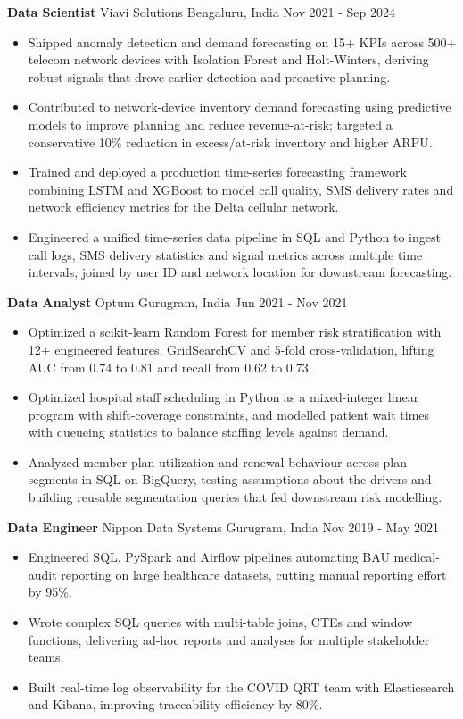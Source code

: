 \documentclass[10pt,a4paper]{article}
\newcommand{\role}[4]{\textbf{#1} \textbar{} #2 \hfill #3 \textbar{} #4\par}
\begin{document}
\vspace{3pt}
\role{Data Scientist}{Viavi Solutions}{Bengaluru, India}{Nov 2021 - Sep 2024}
\begin{itemize}
  \item Shipped anomaly detection and demand forecasting on 15+ KPIs across 500+ telecom network devices with Isolation Forest and Holt-Winters, deriving robust signals that drove earlier detection and proactive planning.
  \item Contributed to network-device inventory demand forecasting using predictive models to improve planning and reduce revenue-at-risk; targeted a conservative 10\% reduction in excess/at-risk inventory and higher ARPU.
  \item Trained and deployed a production time-series forecasting framework combining LSTM and XGBoost to model call quality, SMS delivery rates and network efficiency metrics for the Delta cellular network.
  \item Engineered a unified time-series data pipeline in SQL and Python to ingest call logs, SMS delivery statistics and signal metrics across multiple time intervals, joined by user ID and network location for downstream forecasting.
\end{itemize}
\vspace{3pt}
\role{Data Analyst}{Optum}{Gurugram, India}{Jun 2021 - Nov 2021}
\begin{itemize}
  \item Optimized a scikit-learn Random Forest for member risk stratification with 12+ engineered features, GridSearchCV and 5-fold cross-validation, lifting AUC from 0.74 to 0.81 and recall from 0.62 to 0.73.
  \item Optimized hospital staff scheduling in Python as a mixed-integer linear program with shift-coverage constraints, and modelled patient wait times with queueing statistics to balance staffing levels against demand.
  \item Analyzed member plan utilization and renewal behaviour across plan segments in SQL on BigQuery, testing assumptions about the drivers and building reusable segmentation queries that fed downstream risk modelling.
\end{itemize}
\vspace{3pt}
\role{Data Engineer}{Nippon Data Systems}{Gurugram, India}{Nov 2019 - May 2021}
\begin{itemize}
  \item Engineered SQL, PySpark and Airflow pipelines automating BAU medical-audit reporting on large healthcare datasets, cutting manual reporting effort by 95\%.
  \item Wrote complex SQL queries with multi-table joins, CTEs and window functions, delivering ad-hoc reports and analyses for multiple stakeholder teams.
  \item Built real-time log observability for the COVID QRT team with Elasticsearch and Kibana, improving traceability efficiency by 80\%.
\end{itemize}
\end{document}
